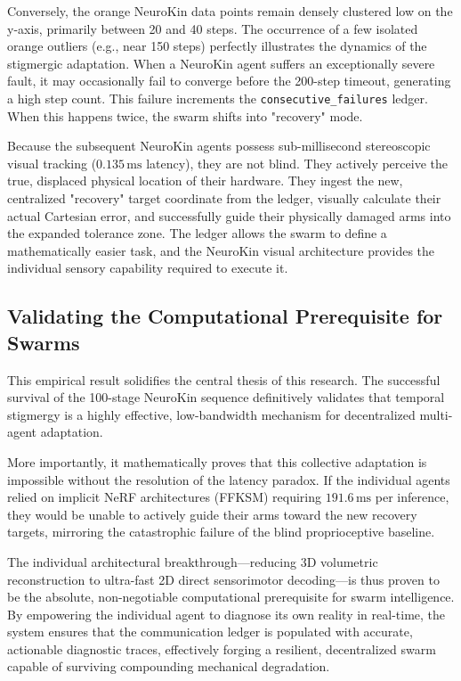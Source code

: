 \documentclass[12pt,a4paper,oneside]{report}
\begin{document}
Conversely, the orange NeuroKin data points remain densely clustered low on the y-axis, primarily between 20 and 40 steps. The occurrence of a few isolated orange outliers (e.g., near 150 steps) perfectly illustrates the dynamics of the stigmergic adaptation. When a NeuroKin agent suffers an exceptionally severe fault, it may occasionally fail to converge before the 200-step timeout, generating a high step count. This failure increments the \texttt{consecutive\_failures} ledger. When this happens twice, the swarm shifts into "recovery" mode. 

Because the subsequent NeuroKin agents possess sub-millisecond stereoscopic visual tracking ($0.135\,\mathrm{ms}$ latency), they are not blind. They actively perceive the true, displaced physical location of their hardware. They ingest the new, centralized "recovery" target coordinate from the ledger, visually calculate their actual Cartesian error, and successfully guide their physically damaged arms into the expanded tolerance zone. The ledger allows the swarm to define a mathematically easier task, and the NeuroKin visual architecture provides the individual sensory capability required to execute it.

\subsection{Validating the Computational Prerequisite for Swarms}

This empirical result solidifies the central thesis of this research. The successful survival of the 100-stage NeuroKin sequence definitively validates that temporal stigmergy is a highly effective, low-bandwidth mechanism for decentralized multi-agent adaptation. 

More importantly, it mathematically proves that this collective adaptation is impossible without the resolution of the latency paradox. If the individual agents relied on implicit NeRF architectures (FFKSM) requiring $191.6\,\mathrm{ms}$ per inference, they would be unable to actively guide their arms toward the new recovery targets, mirroring the catastrophic failure of the blind proprioceptive baseline. 

The individual architectural breakthrough—reducing 3D volumetric reconstruction to ultra-fast 2D direct sensorimotor decoding—is thus proven to be the absolute, non-negotiable computational prerequisite for swarm intelligence. By empowering the individual agent to diagnose its own reality in real-time, the system ensures that the communication ledger is populated with accurate, actionable diagnostic traces, effectively forging a resilient, decentralized swarm capable of surviving compounding mechanical degradation.
\end{document}
